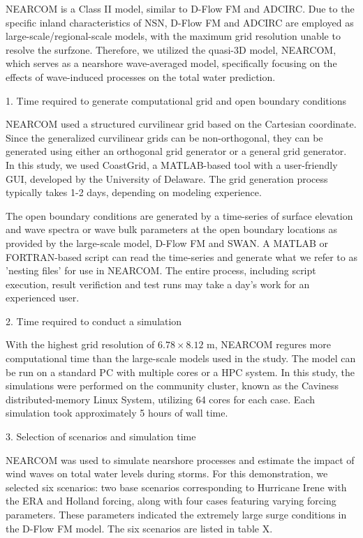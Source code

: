 \documentclass[11pt]{article}
\begin{document}
NEARCOM is a Class II model, similar to D-Flow FM and ADCIRC. Due to the specific inland characteristics of NSN, D-Flow FM and ADCIRC are employed as large-scale/regional-scale models, with the maximum grid resolution unable to resolve the surfzone. Therefore, we utilized the quasi-3D model, NEARCOM, which serves as a nearshore wave-averaged model, specifically focusing on the effects of wave-induced processes on the total water prediction. 

1. Time required to generate computational grid and open boundary conditions

NEARCOM used a structured curvilinear grid based on the Cartesian coordinate. Since the generalized curvilinear grids can be non-orthogonal, they can be generated using either an orthogonal grid generator or a general grid generator. In this study, we used CoastGrid, a MATLAB-based tool with a user-friendly GUI, developed by the University of Delaware. The grid generation process typically takes 1-2 days, depending on modeling experience. 

The open boundary conditions are generated by a time-series of surface elevation and wave spectra or wave bulk parameters at the open boundary locations as provided by the large-scale model, D-Flow FM and SWAN. A MATLAB or FORTRAN-based script can read the time-series and generate what we refer to as 'nesting files' for use in NEARCOM. The entire process, including script execution, result verifiction and test runs may take a day's work for an experienced user. 

2. Time required to conduct a simulation 

With the highest grid resolution of $6.78 \times 8.12$ m, NEARCOM regures more computational time than the large-scale models used in the study. The model can be run on a standard PC with multiple cores or a HPC system. In this study,  the simulations were performed on the community cluster, known as the Caviness distributed-memory Linux System, utilizing 64 cores for each case. Each simulation took approximately 5 hours of wall time. 

 3. Selection of scenarios and simulation time

NEARCOM was used to simulate nearshore processes and estimate the impact of wind waves on total water levels during storms. For this demonstration, we selected six scenarios: two base scenarios corresponding to Hurricane Irene with the ERA and Holland forcing, along with four cases featuring varying forcing parameters. These parameters indicated the extremely large surge conditions in the D-Flow FM model. The six scenarios are listed in table X. 
\end{document}
